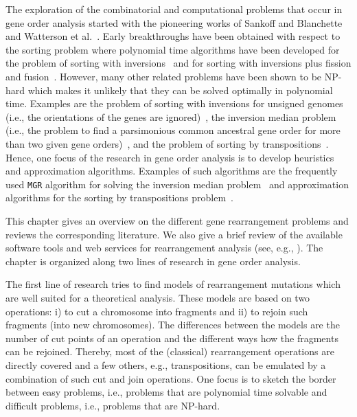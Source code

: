 \documentclass{svmult}
\begin{document}

The exploration of the combinatorial and computational problems that occur in gene order analysis started with the pioneering 
works of Sankoff and Blanchette~\cite{Sankoff_1992} and Watterson et al.~\cite{Watterson_1982}. Early breakthroughs have been 
obtained with respect to the sorting problem where polynomial time algorithms have been developed for the problem of sorting 
with inversions~\cite{Hannenhalli_1999} and for sorting with inversions plus fission and fusion~\cite{Hannenhalli_1995}. However, 
many other related problems have been shown to be NP-hard which makes it
unlikely that they can be solved optimally in polynomial time. Examples are the problem of sorting with inversions for unsigned 
genomes (i.e., the orientations of the genes are ignored)~\cite{Caprara_1997},
the inversion median problem (i.e., the problem to find a parsimonious common ancestral gene order for more than two given gene orders)~\cite{Caprara_2003}, 
and the problem of sorting by transpositions~\cite{Bulteau_2012}. Hence, one focus of the research in gene order 
analysis is to develop heuristics and approximation algorithms. Examples of such
algorithms are the frequently used \texttt{MGR} algorithm for solving the
inversion median problem~\cite{Bourque_2002} and approximation algorithms for the sorting by transpositions problem~\cite{Elias_2006}.

This chapter gives an overview on the different gene rearrangement problems and reviews the corresponding literature. 
We also give a brief review of the available software tools 
and web services for rearrangement analysis (see, e.g., ).
The chapter is organized along two lines of research in gene order analysis. 

The first line of research tries to find models of rearrangement mutations which are well suited for a theoretical analysis. 
These models are based on two operations: i) to cut a chromosome into fragments and ii) to rejoin such fragments (into new chromosomes). 
The differences between the models are the number of cut points of an operation and the different ways how the fragments can be rejoined. 
Thereby, most of the (classical) rearrangement operations are directly covered
and a few others, e.g., transpositions, can be emulated by a combination of such cut and join operations. One focus is to sketch the 
border between easy problems, i.e., problems that are polynomial time solvable and difficult problems, i.e., problems that are NP-hard.
 
\end{document}

